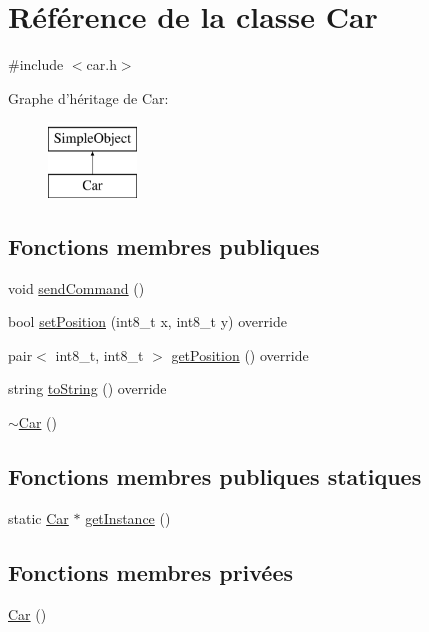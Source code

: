 \hypertarget{classCar}{\section{Référence de la classe Car}
\label{classCar}
}


{\ttfamily \#include $<$car.\-h$>$}

Graphe d'héritage de Car\-:\begin{figure}[H]
\begin{center}
\leavevmode
\includegraphics[height=2.000000cm]{classCar}
\end{center}
\end{figure}
\subsection*{Fonctions membres publiques}
\begin{DoxyCompactItemize}
\item 
void \hyperlink{classCar_a2d3353932e4028eef864813b8c65583b}{send\-Command} ()
\item 
bool \hyperlink{classCar_a97e3c5de8eb65659ef520de6591f814d}{set\-Position} (int8\-\_\-t x, int8\-\_\-t y) override
\item 
pair$<$ int8\-\_\-t, int8\-\_\-t $>$ \hyperlink{classCar_a20dd521474ee36b144bde58e3359eed6}{get\-Position} () override
\item 
string \hyperlink{classCar_afb39c5a80ff1977ee13cb1e5cdf2fecd}{to\-String} () override
\item 
\hyperlink{classCar_a5933bb06e96b159fe339a128abda888a}{$\sim$\-Car} ()
\end{DoxyCompactItemize}
\subsection*{Fonctions membres publiques statiques}
\begin{DoxyCompactItemize}
\item 
static \hyperlink{classCar}{Car} $\ast$ \hyperlink{classCar_a40cbec40dad9ddda76c277da17f23528}{get\-Instance} ()
\end{DoxyCompactItemize}
\subsection*{Fonctions membres privées}
\begin{DoxyCompactItemize}
\item 
\hyperlink{classCar_a1c803f7c5038d3e31b368b0d0a35493c}{Car} ()
\end{DoxyCompactItemize}
